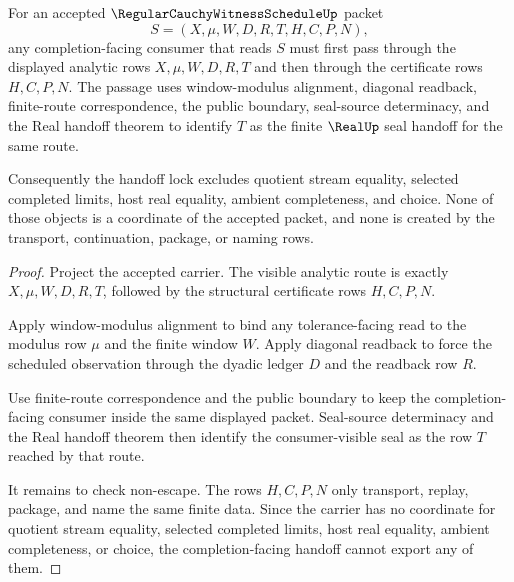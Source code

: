 \begin{theorem}
\label{thm:regular-cauchy-witness-schedule-real-completion-handoff-lock}
For an accepted $\RegularCauchyWitnessScheduleUp$ packet
$$
S=(X,\mu,W,D,R,T,H,C,P,N),
$$
any completion-facing consumer that reads $S$ must first pass through the displayed analytic rows $X,\mu,W,D,R,T$ and then through the certificate rows $H,C,P,N$. The passage uses window-modulus alignment, diagonal readback, finite-route correspondence, the public boundary, seal-source determinacy, and the Real handoff theorem to identify $T$ as the finite $\RealUp$ seal handoff for the same route.

Consequently the handoff lock excludes quotient stream equality, selected completed limits, host real equality, ambient completeness, and choice. None of those objects is a coordinate of the accepted packet, and none is created by the transport, continuation, package, or naming rows.
\end{theorem}
\begin{proof}
Project the accepted carrier. The visible analytic route is exactly $X,\mu,W,D,R,T$, followed by the structural certificate rows $H,C,P,N$.

Apply window-modulus alignment to bind any tolerance-facing read to the modulus row $\mu$ and the finite window $W$. Apply diagonal readback to force the scheduled observation through the dyadic ledger $D$ and the readback row $R$.

Use finite-route correspondence and the public boundary to keep the completion-facing consumer inside the same displayed packet. Seal-source determinacy and the Real handoff theorem then identify the consumer-visible seal as the row $T$ reached by that route.

It remains to check non-escape. The rows $H,C,P,N$ only transport, replay, package, and name the same finite data. Since the carrier has no coordinate for quotient stream equality, selected completed limits, host real equality, ambient completeness, or choice, the completion-facing handoff cannot export any of them.
\end{proof}

